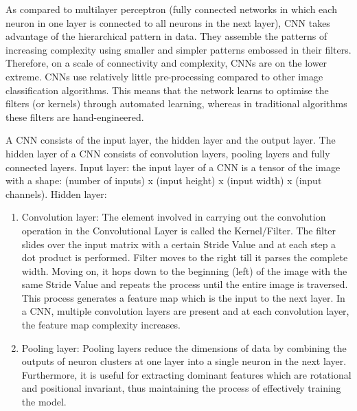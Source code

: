     As compared to multilayer perceptron (fully connected networks in which each neuron in one layer is connected to all neurons in the next layer), CNN takes advantage of the hierarchical pattern in data. They assemble the patterns of increasing complexity using smaller and simpler patterns embossed in their filters. Therefore, on a scale of connectivity and complexity, CNNs are on the lower extreme. CNNs use relatively little pre-processing compared to other image classification algorithms. This means that the network learns to optimise the filters (or kernels) through automated learning, whereas in traditional algorithms these filters are hand-engineered.
    
    A CNN consists of the input layer, the hidden layer and the output layer. The hidden layer of a CNN consists of convolution layers, pooling layers and fully connected layers. 
    Input layer: the input layer of a CNN is a tensor of the image with a shape: (number of inputs) x (input height) x (input width) x (input channels).
    Hidden layer: 
    \begin{enumerate}
    	\item Convolution layer: The element involved in carrying out the convolution operation in the Convolutional Layer is called the Kernel/Filter. The filter slides over the input matrix with a certain Stride Value and at each step a dot product is performed. Filter moves to the right till it parses the complete width. Moving on, it hops down to the beginning (left) of the image with the same Stride Value and repeats the process until the entire image is traversed. This process generates a feature map which is the input to the next layer. In a CNN, multiple convolution layers are present and at each convolution layer, the feature map complexity increases. 
    	\item Pooling layer: Pooling layers reduce the dimensions of data by combining the outputs of neuron clusters at one layer into a single neuron in the next layer. Furthermore, it is useful for extracting dominant features which are rotational and positional invariant, thus maintaining the process of effectively training the model. 
    \end{enumerate}
       
